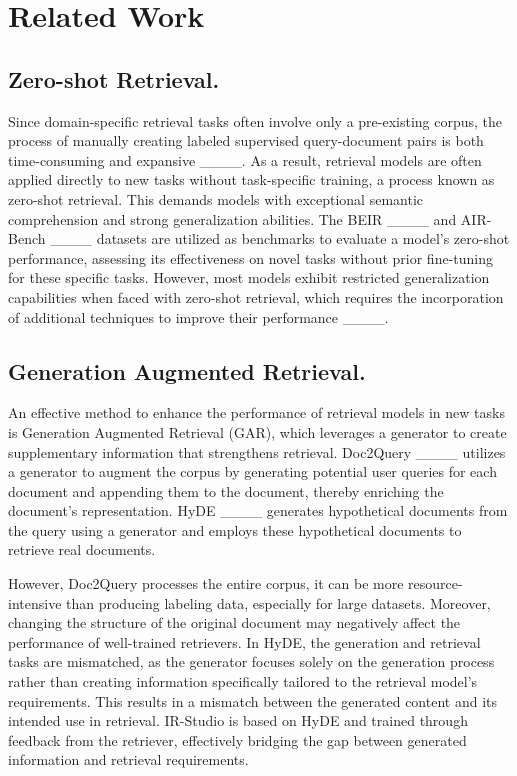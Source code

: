 \section{Related Work}
\subsection{Zero-shot Retrieval.}

Since domain-specific retrieval tasks often involve only a pre-existing corpus, the process of manually creating labeled supervised query-document pairs is both time-consuming and expansive ____. As a result, retrieval models are often applied directly to new tasks without task-specific training, a process known as zero-shot retrieval. This demands models with exceptional semantic comprehension and strong generalization abilities. The BEIR ____ and AIR-Bench ____ datasets are utilized as benchmarks to evaluate a model's zero-shot performance, assessing its effectiveness on novel tasks without prior fine-tuning for these specific tasks. However, most models exhibit restricted generalization capabilities when faced with zero-shot retrieval, which requires the incorporation of additional techniques to improve their performance ____.

\subsection{Generation Augmented Retrieval.}

An effective method to enhance the performance of retrieval models in new tasks is Generation Augmented Retrieval (GAR), which leverages a generator to create supplementary information that strengthens retrieval. Doc2Query ____ utilizes a generator to augment the corpus by generating potential user queries for each document and appending them to the document, thereby enriching the document's representation. HyDE ____ generates hypothetical documents from the query using a generator and employs these hypothetical documents to retrieve real documents.

However, Doc2Query processes the entire corpus, it can be more resource-intensive than producing labeling data, especially for large datasets. Moreover, changing the structure of the original document may negatively affect the performance of well-trained retrievers. In HyDE, the generation and retrieval tasks are mismatched, as the generator focuses solely on the generation process rather than creating information specifically tailored to the retrieval model's requirements. This results in a mismatch between the generated content and its intended use in retrieval.
IR-Studio is based on HyDE and trained through feedback from the retriever, effectively bridging the gap between generated information and retrieval requirements.

